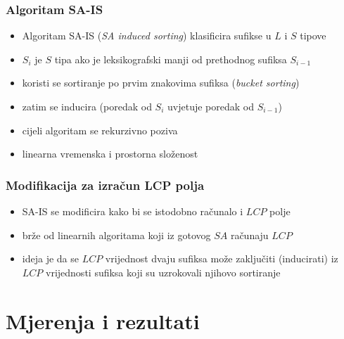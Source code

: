 \documentclass{beamer}
\begin{document}

\begin{frame}
\frametitle{Algoritam SA-IS}

\begin{itemize}
	\item Algoritam SA-IS (\textit{SA induced sorting}) klasificira sufikse u $L$ i $S$ tipove
	\item $S_{i}$ je $S$ tipa ako je leksikografski manji od prethodnog sufiksa $S_{i-1}$
	\item koristi se sortiranje po prvim znakovima sufiksa (\textit{bucket sorting})
	\item zatim se inducira (poredak od $S_{i}$ uvjetuje poredak od $S_{i-1}$)
	\item cijeli algoritam se rekurzivno poziva
	\item linearna vremenska i prostorna složenost
\end{itemize}

\end{frame}


\begin{frame}
\frametitle{Modifikacija za izračun LCP polja}

\begin{itemize}
	\item SA-IS se modificira kako bi se istodobno računalo i $LCP$ polje
	\item brže od linearnih algoritama koji iz gotovog $SA$ računaju $LCP$
	\item ideja je da se $LCP$ vrijednost dvaju sufiksa može zaključiti (inducirati) iz $LCP$ vrijednosti sufiksa koji su uzrokovali njihovo sortiranje
\end{itemize}

\end{frame}

\section{Mjerenja i rezultati} 
\end{document}
